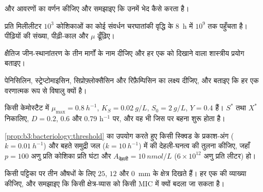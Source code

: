 \begin{exercise}[$\star$]\label{exo:b3:bacteriology:1}
 और  आवरणों का वर्णन कीजिए और समझाइए कि
 उनमें भेद कैसे करता है।
\end{exercise}

\begin{exercise}[$\star$]\label{exo:b3:bacteriology:2}
प्रति मिलीलीटर $10^{3}$ कोशिकाओं का कोई संवर्धन चरघातांकी वृद्धि के
\qty{8}{h} में $10^{9}$ तक पहुँचता है। पीढ़ियों की संख्या, पीढ़ी-काल और
$\mu$ ढूँढ़िए।
\end{exercise}

\begin{exercise}[$\star$]\label{exo:b3:bacteriology:3}
क्षैतिज जीन-स्थानांतरण के तीन मार्गों के नाम दीजिए और हर एक को दिखाने
वाला शास्त्रीय प्रयोग बताइए।
\end{exercise}

\begin{exercise}[$\star$]\label{exo:b3:bacteriology:4}
पेनिसिलिन, स्ट्रेप्टोमाइसिन, सिप्रोफ़्लोक्सैसिन और रिफ़ैम्पिसिन का
लक्ष्य दीजिए, और बताइए कि हर एक वरणात्मक रूप से विषालु क्यों है।
\end{exercise}

\begin{exercise}[$\star\star$]\label{exo:b3:bacteriology:5}
किसी केमोस्टैट में $\mu_{\max} = \qty{0.8}{h^{-1}}$, $K_{S} =
\qty{0.02}{g/L}$, $S_{0} = \qty{2}{g/L}$, $Y = 0.4$ हैं। $S^{*}$ तथा
$X^{*}$ निकालिए, $D = 0.2$,
$0.6$ और $0.79$ h$^{-1}$ पर, और वह  भी जिस पर बहना शुरू होता है।
\end{exercise}

\begin{exercise}[$\star\star$]\label{exo:b3:bacteriology:6}
\cref{prop:b3:bacteriology:threshold} का उपयोग करते हुए किसी स्क्विड के
प्रकाश-अंग ($k =
\qty{0.01}{h^{-1}}$) और बहते समुद्री जल ($k = \qty{10}{h^{-1}}$) में
 की देहली-घनत्व की तुलना कीजिए, जहाँ $p = 100$ अणु प्रति
कोशिका प्रति घंटा और $A_{\text{देहली}} =
\qty{10}{nmol/L}$ ($6\times 10^{12}$ अणु प्रति लीटर) हो।
\end{exercise}

\begin{exercise}[$\star\star$]\label{exo:b3:bacteriology:7}
किसी  पट्टिका पर तीन औषधों के लिए $25$, $12$ और
\qty{0}{mm} के क्षेत्र दिखते हैं। हर एक की व्याख्या कीजिए, और समझाइए कि
किसी क्षेत्र-व्यास को किसी MIC में क्यों बदला जा सकता है।
\end{exercise}

